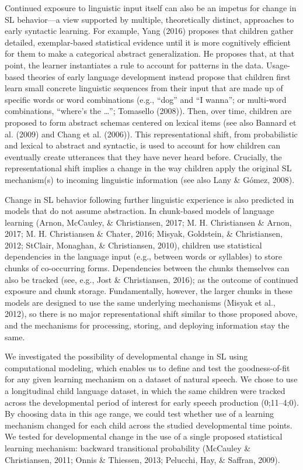 \documentclass[man,mask,floatsintext]{apa6}
\theoremstyle{definition}
\theoremstyle{definition}
\theoremstyle{definition}
\theoremstyle{remark}
\begin{document}
Continued exposure to linguistic input itself can also be an impetus for
change in SL behavior---a view supported by multiple, theoretically
distinct, approaches to early syntactic learning. For example, Yang
(2016) proposes that children gather detailed, exemplar-based
statistical evidence until it is more cognitively efficient for them to
make a categorical abstract generalization. He proposes that, at that
point, the learner instantiates a rule to account for patterns in the
data. Usage-based theories of early language development instead propose
that children first learn small concrete linguistic sequences from their
input that are made up of specific words or word combinations (e.g.,
\enquote{dog} and \enquote{I wanna}; or multi-word combinations,
\enquote{where's the \ldots{}}; Tomasello (2008)). Then, over time,
children are proposed to form abstract schemas centered on lexical items
(see also Bannard et al. (2009) and Chang et al. (2006)). This
representational shift, from probabilistic and lexical to abstract and
syntactic, is used to account for how children can eventually create
utterances that they have never heard before. Crucially, the
representational shift implies a change in the way children apply the
original SL mechanism(s) to incoming linguistic information (see also
Lany \& Gómez, 2008).

Change in SL behavior following further linguistic experience is also
predicted in models that do not assume abstraction. In chunk-based
models of language learning (Arnon, McCauley, \& Christiansen, 2017; M.
H. Christiansen \& Arnon, 2017; M. H. Christiansen \& Chater, 2016;
Misyak, Goldstein, \& Christiansen, 2012; StClair, Monaghan, \&
Christiansen, 2010), children use statistical dependencies in the
language input (e.g., between words or syllables) to store chunks of
co-occurring forms. Dependencies between the chunks themselves can also
be tracked (see, e.g., Jost \& Christiansen, 2016); as the outcome of
continued exposure and chunk storage. Fundamentally, however, the larger
chunks in these models are designed to use the same underlying
mechanisms (Misyak et al., 2012), so there is no major representational
shift similar to those proposed above, and the mechanisms for
processing, storing, and deploying information stay the same.

We investigated the possibility of developmental change in SL using
computational modeling, which enables us to define and test the
goodness-of-fit for any given learning mechanism on a dataset of natural
speech. We chose to use a longitudinal child language dataset, in which
the same children were tracked across the developmental period of
interest for early speech production (0;11--4;0). By choosing data in
this age range, we could test whether use of a learning mechanism
changed for each child across the studied developmental time points. We
tested for developmental change in the use of a single proposed
statistical learning mechanism: backward transitional probability
(McCauley \& Christiansen, 2011; Onnis \& Thiessen, 2013; Pelucchi, Hay,
\& Saffran, 2009).
\end{document}

